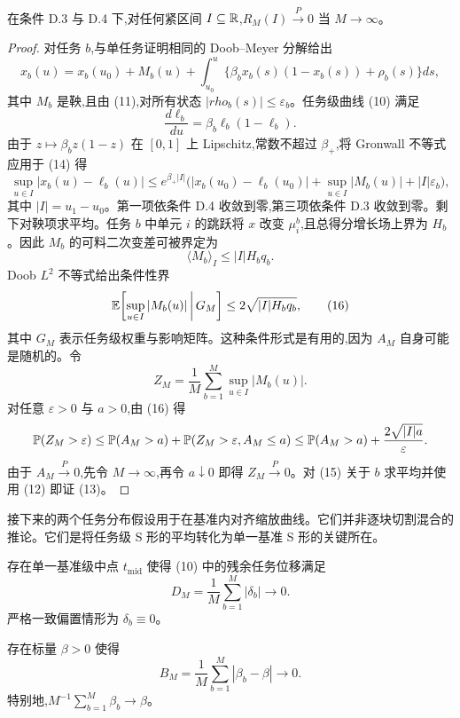 \begin{lemma}[平均误差上确界的多任务极限]
在条件 D.3 与 D.4 下,对任何紧区间 $I \subseteq \mathbb{R}$,$R_{M}(I) \xrightarrow{P} 0$ 当 $M \to \infty$。
\end{lemma}

\begin{proof}
对任务 $b$,与单任务证明相同的 Doob--Meyer 分解给出
\[
    x_{b}(u) = x_{b}(u_{0}) + M_{b}(u) + \int_{u_{0}}^{u} \bigl\{ \beta_{b} x_{b}(s)(1 - x_{b}(s)) + \rho_{b}(s) \bigr\} ds, \tag{14}
\]
其中 $M_{b}$ 是鞅,且由 (11),对所有状态 $|rho_{b}(s)| \leq \varepsilon_{b}$。任务级曲线 (10) 满足
\[
    \frac{d \ell_{b}}{du} = \beta_{b} \ell_{b} (1 - \ell_{b}).
\]
由于 $z \mapsto \beta_{b} z (1 - z)$ 在 $[0, 1]$ 上 Lipschitz,常数不超过 $\beta_{+}$,将 Gronwall 不等式应用于 (14) 得
\[
    \sup_{u \in I} |x_{b}(u) - \ell_{b}(u)|
    \leq e^{\beta_{+} |I|} \bigl( |x_{b}(u_{0}) - \ell_{b}(u_{0})| + \sup_{u \in I} |M_{b}(u)| + |I| \varepsilon_{b} \bigr), \tag{15}
\]
其中 $|I| = u_{1} - u_{0}$。第一项依条件 D.4 收敛到零,第三项依条件 D.3 收敛到零。剩下对鞅项求平均。任务 $b$ 中单元 $i$ 的跳跃将 $x$ 改变 $\mu^{b}_{i}$,且总得分增长场上界为 $H_{b}$。因此 $M_{b}$ 的可料二次变差可被界定为
\[
    \langle M_{b} \rangle_{I} \leq |I| H_{b} q_{b}.
\]
Doob $L^{2}$ 不等式给出条件性界
\[
    \mathbb{E}\biggl[ \sup_{u \in I} |M_{b}(u)| \,\bigg|\, G_{M} \biggr]
    \leq 2 \sqrt{|I| H_{b} q_{b}}, \tag{16}
\]
其中 $G_{M}$ 表示任务级权重与影响矩阵。这种条件形式是有用的,因为 $A_{M}$ 自身可能是随机的。令
\[
    Z_{M} = \frac{1}{M} \sum_{b=1}^{M} \sup_{u \in I} |M_{b}(u)|.
\]
对任意 $\varepsilon > 0$ 与 $a > 0$,由 (16) 得
\[
    \mathbb{P}(Z_{M} > \varepsilon) \leq \mathbb{P}(A_{M} > a) + \mathbb{P}(Z_{M} > \varepsilon, A_{M} \leq a)
    \leq \mathbb{P}(A_{M} > a) + \frac{2 \sqrt{|I| a}}{\varepsilon}.
\]
由于 $A_{M} \xrightarrow{P} 0$,先令 $M \to \infty$,再令 $a \downarrow 0$ 即得 $Z_{M} \xrightarrow{P} 0$。对 (15) 关于 $b$ 求平均并使用 (12) 即证 (13)。
\end{proof}

接下来的两个任务分布假设用于在基准内对齐缩放曲线。它们并非逐块切割混合的推论。它们是将任务级 S 形的平均转化为单一基准 S 形的关键所在。

\begin{assumption}[一致对数时间偏置]
存在单一基准级中点 $t_{\mathrm{mid}}$ 使得 (10) 中的残余任务位移满足
\[
    D_{M} = \frac{1}{M} \sum_{b=1}^{M} |\delta_{b}| \to 0.
\]
严格一致偏置情形为 $\delta_{b} \equiv 0$。
\end{assumption}

\begin{assumption}[集中的环境学习速度]
存在标量 $\beta > 0$ 使得
\[
    B_{M} = \frac{1}{M} \sum_{b=1}^{M} |\beta_{b} - \beta| \to 0.
\]
特别地,$M^{-1} \sum_{b=1}^{M} \beta_{b} \to \beta$。
\end{assumption}

